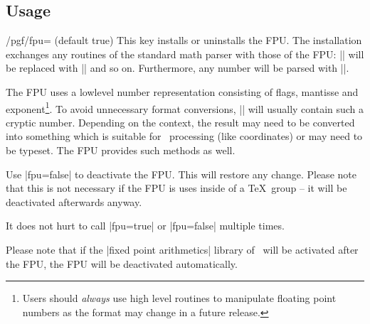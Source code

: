 \subsection{Usage}
\begin{key}{/pgf/fpu= (default true)}
	This key installs or uninstalls the FPU. The installation exchanges any routines of the standard math parser with those of the FPU: |\pgfmathadd| will be replaced with |\pgfmathfloatadd| and so on. Furthermore, any number will be parsed with |\pgfmathfloatparsenumber|.

\begin{codeexample}[]
\pgfmathresult
\end{codeexample}
\noindent The FPU uses a lowlevel number representation consisting of flags, mantisse and exponent\footnote{Users should \emph{always} use high level routines to manipulate floating point numbers as the format may change in a future release.}. To avoid unnecessary format conversions, |\pgfmathresult| will usually contain such a cryptic number. Depending on the context, the result may need to be converted into something which is suitable for \pgfname\ processing (like coordinates) or may need to be typeset. The FPU provides such methods as well.


	Use |fpu=false| to deactivate the FPU. This will restore any change. Please note that this is not necessary if the FPU is uses inside of a \TeX\ group -- it will be deactivated afterwards anyway.

	It does not hurt to call |fpu=true| or |fpu=false| multiple times.

	Please note that if the |fixed point arithmetics| library of \pgfname\ will be activated after the FPU, the FPU will be deactivated automatically.
\end{key}

